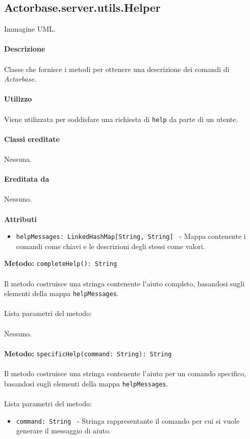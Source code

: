 \documentclass[a4paper]{article}
\begin{document}
			
	\subsection{Actorbase.server.utils.Helper}
		Immagine UML.
		\\ \\
		\textbf{Descrizione}
			\\ \\
			Classe che fornisce i metodi per ottenere una descrizione dei comandi di \emph{Actorbase}.
			\\ \\
		\textbf{Utilizzo}
			\\ \\
			Viene utilizzata per soddisfare una richiesta di \texttt{help} da parte di un utente.
			\\ \\
		\textbf{Classi ereditate}
			\\ \\
			Nessuna.
			\\ \\
		\textbf{Ereditata da}
			\\ \\
			Nessuno.
			\\ \\
		\textbf{Attributi}
			\begin{itemize}
				\item \texttt{helpMessages: LinkedHashMap[String, String] } - Mappa contenente i comandi come chiavi e le descrizioni degli stessi come valori.
			\end{itemize}
		\textbf{Metodo: }\texttt{completeHelp(): String}
			\\ \\
			Il metodo costruisce una stringa contenente l'aiuto completo, basandosi sugli elementi della mappa \texttt{helpMessages}.
			\\ \\
			Lista parametri del metodo:
			\\ \\
			Nessuno.
			\\ \\
		\textbf{Metodo: }\texttt{specificHelp(command: String): String}
			\\ \\
			Il metodo costruisce una stringa contenente l'aiuto per un comando specifico, basandosi sugli elementi della mappa \texttt{helpMessages}.
			\\ \\
			Lista parametri del metodo:
			\begin{itemize}
				\item \texttt{command: String } - Stringa rappresentante il comando per cui si vuole generare il messaggio di aiuto.
			\end{itemize}
			
\end{document}
